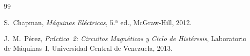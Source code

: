\documentclass[12pt,a4paper]{article}
\begin{document}


\tableofcontents
\newpage






\begin{thebibliography}{99}

S.~Chapman, \textit{Máquinas Eléctricas}, 5.ª ed., McGraw-Hill, 2012.

J.~M.~Pérez, \textit{Práctica~2: Circuitos Magnéticos y Ciclo de Histéresis}, Laboratorio de Máquinas~I, Universidad Central de Venezuela, 2013.

\end{thebibliography}
\end{document}

